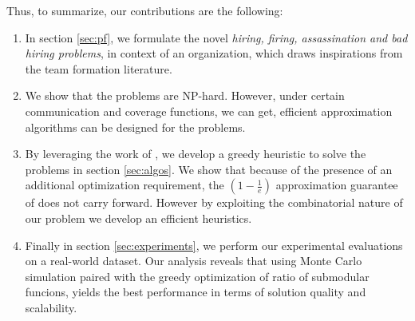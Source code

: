 Thus, to summarize, our contributions are the following:

\begin{enumerate}
\item In section \ref{sec:pf}, we formulate the novel \textit{hiring, firing, assassination and bad hiring problems}, in context of an organization, which draws inspirations from the team formation literature.

\item We show that the problems are NP-hard. However, under certain communication and coverage functions, we can get, efficient approximation algorithms can be designed for the problems.

\item By leveraging the work of \cite{bai2016algorithms}, we develop a greedy heuristic to solve the problems in section \ref{sec:algos}. We show that because of the presence of an additional optimization requirement, the $(1 - \frac{1}{e})$ approximation guarantee of \cite{bai2016algorithms} does not carry forward. However by exploiting the combinatorial nature of our problem we develop an efficient heuristics.

\item Finally in section \ref{sec:experiments}, we perform our experimental evaluations on a real-world dataset. Our analysis reveals that using Monte Carlo simulation paired with the greedy optimization of ratio of submodular funcions, yields the best performance in terms of solution quality and scalability.

\end{enumerate}